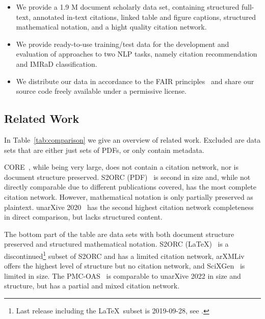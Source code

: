 
\begin{itemize}
    \item We provide a 1.9 M document scholarly data set, containing structured full-text, annotated in-text citations, linked table and figure captions, structured mathematical notation, and a hight quality citation network.
    \item We provide ready-to-use training/test data for the development and evaluation of approaches to two NLP tasks, namely citation recommendation and IMRaD classification.
    \item We distribute our data in accordance to the FAIR principles~\cite{Wilkinson2016} and share our source code freely available under a permissive license.
\end{itemize}

\subsection{Related Work}

In Table~\ref{tab:comparison} we give an overview of related work.
Excluded are data sets that are either just sets of PDFs, or only contain metadata.

CORE~\cite{core}, while being very large, does not contain a citation network, nor is document structure preserved.
S2ORC (PDF)~\cite{Lo2020} is second in size and, while not directly comparable due to different publications covered, has the most complete citation network. However, mathematical notation is only partially preserved as plaintext.
unarXive 2020~\cite{Saier2020} has the second highest citation network completeness in direct comparison, but lacks structured content.

The bottom part of the table are data sets with both document structure preserved and structured mathematical notation.
S2ORC (\LaTeX)~\cite{Lo2020} is a discontinued\footnote{Last release including the \LaTeX\ subset is 2019-09-28, see .} subset of S2ORC and has a limited citation network, 
arXMLiv~\cite{arXMLiv} offers the highest level of structure but no citation network, and 
SciXGen~\cite{chen2021-scixgen} is limited in size.
The PMC-OAS~ is comparable to unarXive 2022 in size and structure, but has a partial and mixed citation network.


